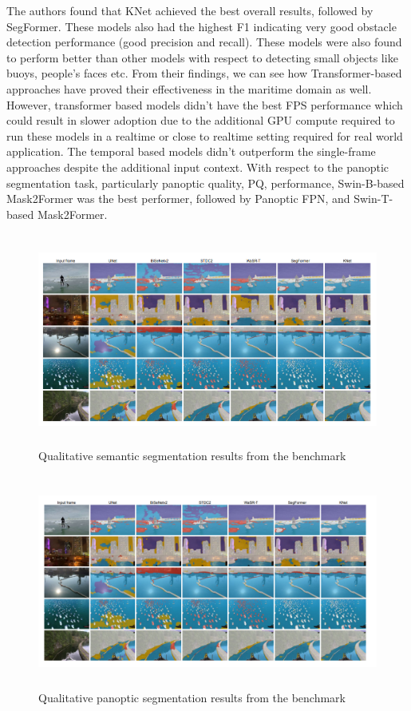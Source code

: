 The authors found that KNet achieved the best overall results,
followed by SegFormer.  These models also had the highest F1 indicating very good obstacle detection performance (good precision and recall). These models were also found to perform better than other models with respect to detecting small objects like buoys, people's faces etc. From their findings, we can see how Transformer-based approaches have proved their effectiveness in the maritime domain as well. However, transformer based models didn't have the best FPS performance which could result in slower adoption due to the additional GPU compute required to run these models in a realtime or close to realtime setting required for real world application. The temporal based models didn't outperform the single-frame approaches despite the additional input context. With respect to the panoptic segmentation task, particularly panoptic quality, PQ, performance, Swin-B-based Mask2Former was the best performer, followed by Panoptic FPN, and Swin-T-based Mask2Former. 
\begin{figure}[H]
    \centering
    \includegraphics[width=\textwidth,height=7cm,keepaspectratio=true]{src/Images/lars_op.PNG}
    \caption{
     Qualitative semantic segmentation results from the benchmark\cite{Zust_2023_ICCV}
     }
\end{figure}

\begin{figure}[H]
    \centering
    \includegraphics[width=\textwidth,height=7cm,keepaspectratio=true]{src/Images/lars_op_2.PNG}
    \caption{
     Qualitative panoptic segmentation results from the benchmark\cite{Zust_2023_ICCV}
     }
\end{figure}
\\

